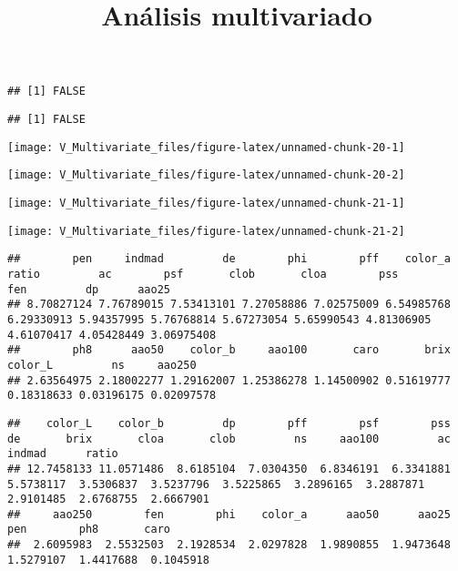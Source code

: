 \documentclass[
]{article}
\title{Análisis multivariado}
\author{}
\date{\vspace{-2.5em}}
\begin{document}
\maketitle

\begin{verbatim}
## [1] FALSE
\end{verbatim}

\begin{verbatim}
## [1] FALSE
\end{verbatim}

\begin{center}\texttt{[image: V\_Multivariate\_files/figure-latex/unnamed-chunk-20-1]} \end{center}

\begin{center}\texttt{[image: V\_Multivariate\_files/figure-latex/unnamed-chunk-20-2]} \end{center}

\begin{center}\texttt{[image: V\_Multivariate\_files/figure-latex/unnamed-chunk-21-1]} \end{center}

\begin{center}\texttt{[image: V\_Multivariate\_files/figure-latex/unnamed-chunk-21-2]} \end{center}

\begin{verbatim}
##        pen     indmad         de        phi        pff    color_a      ratio         ac        psf       clob       cloa        pss        fen         dp      aao25 
## 8.70827124 7.76789015 7.53413101 7.27058886 7.02575009 6.54985768 6.29330913 5.94357995 5.76768814 5.67273054 5.65990543 4.81306905 4.61070417 4.05428449 3.06975408 
##        ph8      aao50    color_b     aao100       caro       brix    color_L         ns     aao250 
## 2.63564975 2.18002277 1.29162007 1.25386278 1.14500902 0.51619777 0.18318633 0.03196175 0.02097578
\end{verbatim}

\begin{verbatim}
##    color_L    color_b         dp        pff        psf        pss         de       brix       cloa       clob         ns     aao100         ac     indmad      ratio 
## 12.7458133 11.0571486  8.6185104  7.0304350  6.8346191  6.3341881  5.5738117  3.5306837  3.5237796  3.5225865  3.2896165  3.2887871  2.9101485  2.6768755  2.6667901 
##     aao250        fen        phi    color_a      aao50      aao25        pen        ph8       caro 
##  2.6095983  2.5532503  2.1928534  2.0297828  1.9890855  1.9473648  1.5279107  1.4417688  0.1045918
\end{verbatim}
\end{document}
